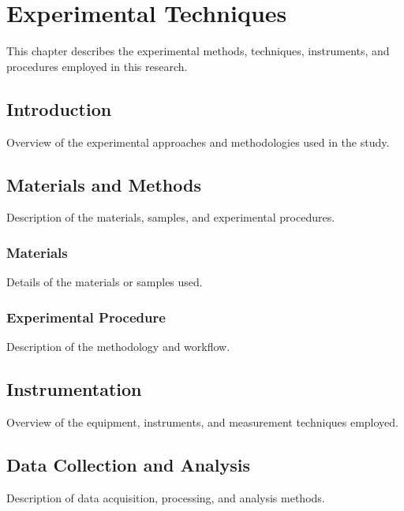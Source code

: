 \chapter{Experimental Techniques}
\label{chap:experimental_techniques}

This chapter describes the experimental methods, techniques, instruments, and procedures employed in this research.

\section{Introduction}
Overview of the experimental approaches and methodologies used in the study.

\section{Materials and Methods}
Description of the materials, samples, and experimental procedures.

\subsection{Materials}
Details of the materials or samples used.

\subsection{Experimental Procedure}
Description of the methodology and workflow.

\section{Instrumentation}
Overview of the equipment, instruments, and measurement techniques employed.

\section{Data Collection and Analysis}
Description of data acquisition, processing, and analysis methods.
